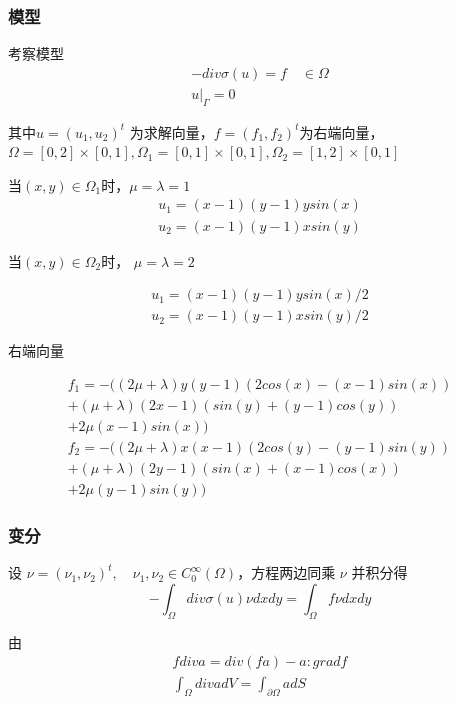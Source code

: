\documentclass[a4paper,UTF8,titlepage]{ctexart}
\begin{document}
\subsubsection{模型}

考察模型
$$
\begin{matrix}
	-div \sigma(u) = f \quad \in \Omega  \\
	u |_{\Gamma} = 0
\end{matrix}
$$ 
\par
其中$ u = (u_1,u_2)^t $ 为求解向量，$ f = (f_1,f_2)^t $为右端向量，$ \Omega = [0,2] \times [0,1] , \Omega_1 = [0,1] \times [0,1] , \Omega_2 = [1,2] \times [0,1]$

当$(x,y) \in \Omega_1$时，$\mu = \lambda = 1$
$$
\begin{matrix}
	u_1 = (x - 1)(y - 1) y sin(x) 
	\\
	u_2 = (x - 1)(y - 1) x sin(y) 
\end{matrix}
$$

当$(x,y) \in \Omega_2$时， $\mu = \lambda = 2$

$$
\begin{matrix}
	u_1 = (x - 1)(y - 1) y sin(x) / 2 
	\\
	u_2 = (x - 1)(y - 1) x sin(y) / 2
\end{matrix}
$$

右端向量

$$
\begin{matrix}
	f_1 = -((2 \mu + \lambda) y (y - 1) (2 cos(x) - (x - 1) sin(x)) \\
	+ (\mu + \lambda) (2 x - 1) (sin(y) + (y - 1) cos(y)) \\
	+ 2 \mu (x - 1) sin(x)) 
	\\
	f_2 = -((2 \mu + \lambda) x (x - 1) (2 cos(y) - (y - 1) sin(y)) \\
	+ (\mu + \lambda) (2 y - 1) (sin(x) + (x - 1) cos(x)) \\ 
	+ 2 \mu (y - 1) sin(y))
\end{matrix}
$$

\subsubsection{变分}

设 $\nu = (\nu_1,\nu_2)^t, \quad \nu_1, \nu_2 \in C_0^{\infty}(\Omega)$，方程两边同乘 $\nu$ 并积分得
$$
-\int_{\Omega} div \sigma(u) \nu dxdy = \int_{\Omega} f \nu dxdy
$$

由
$$
\begin{matrix}
	f div a = div(fa) - a : grad f \\
	\int_{\Omega} div a dV = \int_{\partial \Omega} a dS
\end{matrix}
$$
\end{document}
